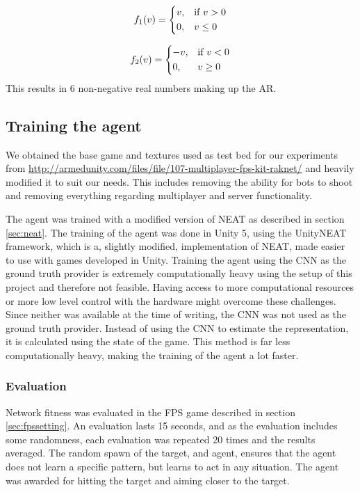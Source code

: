 \[
    f_1(v) =  
\begin{dcases}
    v,& \text{if } v > 0\\
    0,              & v \leq 0
\end{dcases}
\]

\[
    f_2(v) =  
\begin{dcases}
    -v,& \text{if } v < 0\\
    0,              & v \geq 0
\end{dcases}
\]
\noindent
This results in 6 non-negative real numbers making up the AR.

\subsection{Training the agent}
\label{sub:training-neat}
We obtained the base game and textures used as test bed for our experiments from \url{http://armedunity.com/files/file/107-multiplayer-fps-kit-raknet/} and heavily modified it to suit our needs. This includes removing the ability for bots to shoot and removing everything regarding multiplayer and server functionality. 

The agent was trained with a modified version of NEAT as described in section \ref{sec:neat}. The training of the agent was done in Unity 5, using the UnityNEAT framework, which is a, slightly modified, implementation of NEAT, made easier to use with games developed in Unity.
Training the agent using the CNN as the ground truth provider is extremely computationally heavy using the setup of this project and therefore not feasible. Having access to more computational resources or more low level control with the hardware might overcome these challenges. Since neither was available at the time of writing, the CNN was not used as the ground truth provider. Instead of using the CNN to estimate the representation, it is calculated using the state of the game. This method is far less computationally heavy, making the training of the agent a lot faster.

\subsubsection{Evaluation}
Network fitness was evaluated in the FPS game described in section \ref{sec:fpssetting}. An evaluation lasts 15 seconds, and as the evaluation includes some randomness, each evaluation was repeated 20 times and the results averaged. The random spawn of the target, and agent, ensures that the agent does not learn a specific pattern, but learns to act in any situation. The agent was awarded for hitting the target and aiming closer to the target.

